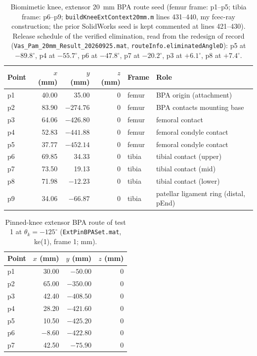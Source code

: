 \begin{table}
\caption{Biomimetic knee, extensor \qty{20}{\mm} BPA route seed (femur frame: p1--p5; tibia frame: p6--p9; \texttt{buildKneeExtContext20mm.m} lines 431--440, my fcec-ray construction; the prior SolidWorks seed is kept commented at lines 421--430). Release schedule of the verified elimination, read from the redesign of record (\texttt{Vas\_Pam\_20mm\_Result\_20260925.mat}, \texttt{routeInfo.eliminatedAngleD}): p5 at $-89.8^{\circ}$, p4 at $-55.7^{\circ}$, p6 at $-47.8^{\circ}$, p7 at $-20.2^{\circ}$, p3 at $+6.1^{\circ}$, p8 at $+7.4^{\circ}$.}
\label{tab:app_ext_seed}
\begin{tabular}{@{}lrrrll@{}}
\toprule
\textbf{Point} & $x$ (mm) & $y$ (mm) & $z$ (mm) & \textbf{Frame} & \textbf{Role} \\
\midrule
p1 & 40.00 & 35.00  & 0 & femur & BPA origin (attachment) \\
p2 & 83.90 & $-274.76$ & 0 & femur & BPA contacts mounting base \\
p3 & 64.06 & $-426.80$ & 0 & femur & femoral contact \\
p4 & 52.83 & $-441.88$ & 0 & femur & femoral condyle contact \\
p5 & 37.77 & $-452.14$ & 0 & femur & femoral condyle contact \\
p6 & 69.85 & 34.33  & 0 & tibia & tibial contact (upper) \\
p7 & 73.50 & 19.13  & 0 & tibia & tibial contact (mid) \\
p8 & 71.98 & $-12.23$ & 0 & tibia & tibial contact (lower) \\
p9 & 34.06 & $-66.87$ & 0 & tibia & patellar ligament ring (distal, pEnd) \\
\bottomrule
\end{tabular}
\end{table}

\begin{table}[htbp]
\caption{Pinned-knee extensor BPA route of test 1 at $\theta_{k}=-125^{\circ}$ (\texttt{ExtPinBPASet.mat}, ke(1), frame 1; mm).}
\label{tab:app_extpin_route}
\begin{tabular}{@{}lrrr@{}}
\toprule
\textbf{Point} & $x$ (mm) & $y$ (mm) & $z$ (mm) \\
\midrule
p1 & 30.00  & $-50.00$ & 0 \\
p2 & 65.00  & $-350.00$ & 0 \\
p3 & 42.40  & $-408.50$ & 0 \\
p4 & 28.20  & $-421.60$ & 0 \\
p5 & 10.50  & $-425.20$ & 0 \\
p6 & $-8.60$ & $-422.80$ & 0 \\
p7 & 42.50  & $-75.90$ & 0 \\
\bottomrule
\end{tabular}
\end{table}

